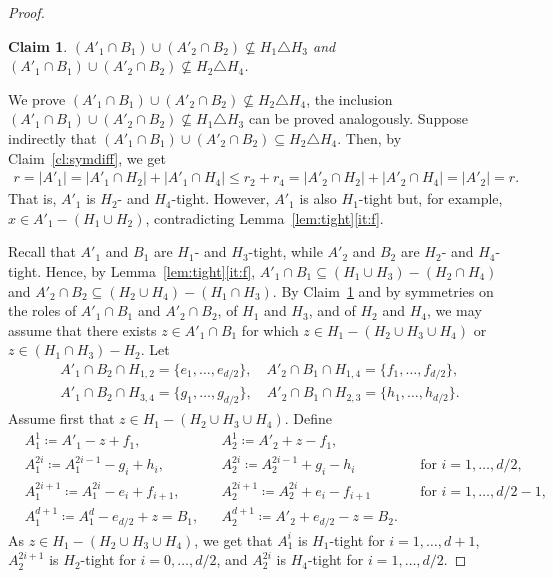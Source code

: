 \documentclass[11pt,a4paper]{article}
\theoremstyle{plain}
\newtheorem{cl}[thm]{Claim}
\theoremstyle{definition}
\newenvironment{claimproof}[1][\proofname]
  {%
    \proof[#1]%
      \renewcommand*\qedsymbol{$\bullet$}%
  }
  {%
    \endproof%
  }
\begin{document}
\begin{proof}
\begin{cl}\label{cl:z}
$(A'_1\cap B_1)\cup(A'_2\cap B_2)\not\subseteq H_1\triangle H_3$ and $(A'_1\cap B_1)\cup(A'_2\cap B_2)\not\subseteq H_2\triangle H_4$.
\end{cl}
\begin{claimproof} 
We prove $(A'_1 \cap B_1) \cup (A'_2 \cap B_2) \not\subseteq H_2 \triangle H_4$, the inclusion $(A'_1 \cap B_1) \cup (A'_2 \cap B_2) \not\subseteq H_1 \triangle H_3$ can be proved analogously. Suppose indirectly that $(A'_1\cap B_1)\cup(A'_2\cap B_2)\subseteq H_2\triangle H_4$. Then, by Claim~\ref{cl:symdiff}, we get
\begin{align*}
r=|A'_1|=|A'_1\cap H_2|+|A'_1\cap H_4|
\leq r_2+r_4=|A'_2\cap H_2|+|A'_2\cap H_4|
= |A'_2|=r.
\end{align*}
That is, $A'_1$ is $H_2$- and $H_4$-tight. However, $A'_1$ is also $H_1$-tight but, for example, $x\in A'_1-(H_1\cup H_2)$, contradicting Lemma~\ref{lem:tight}\ref{it:f}. 
\end{claimproof}

Recall that $A'_1$ and $B_1$ are $H_1$- and $H_3$-tight, while $A'_2$ and $B_2$ are $H_2$- and $H_4$-tight. Hence, by Lemma~\ref{lem:tight}\ref{it:f}, $A'_1\cap B_1\subseteq (H_1\cup H_3)-(H_2\cap H_4)$ and $A'_2\cap B_2\subseteq (H_2\cup H_4)-(H_1\cap H_3)$. By Claim~\ref{cl:z} and by symmetries on the roles of $A'_1\cap B_1$ and $A'_2\cap B_2$, of $H_1$ and $H_3$, and of $H_2$ and $H_4$, we may assume that there exists $z\in A'_1\cap B_1$ for which $z\in H_1-(H_2\cup H_3\cup H_4)$ or $z\in (H_1\cap H_3)-H_2$. Let 
\begin{gather*}
A'_1\cap B_2\cap H_{1,2}=\{e_1,\dots,e_{d/2}\},\quad A'_2\cap B_1\cap H_{1,4}=\{f_1,\dots,f_{d/2}\},\\ 
A'_1\cap B_2\cap H_{3,4}=\{g_1,\dots,g_{d/2}\},\quad A'_2\cap B_1\cap H_{2,3}=\{h_1,\dots,h_{d/2}\}.
\end{gather*}
Assume first that $z\in H_1-(H_2\cup H_3\cup H_4)$. Define 
\begin{align*}
    &A^1_1\coloneqq A'_1-z+f_1, &&A^1_2\coloneqq A'_2+z-f_1, &&\\
    &A^{2i}_1\coloneqq A^{2i-1}_1-g_i+h_i, &&A^{2i}_2\coloneqq A^{2i-1}_2+g_i-h_i && \text{for $i=1,\dots,d/2$,}\\
    &A^{2i+1}_1\coloneqq A^{2i}_1-e_i+f_{i+1}, &&A^{2i+1}_2\coloneqq A^{2i}_2+e_i-f_{i+1} && \text{for $i=1,\dots,d/2-1$,}\\
    &A^{d+1}_1\coloneqq A^{d}_1-e_{d/2}+z=B_1, &&A^{d+1}_2\coloneqq A'_2+e_{d/2}-z=B_2. &&
\end{align*}
As $z\in H_1-(H_2\cup H_3\cup H_4)$, we get that $A^i_1$ is $H_1$-tight for $i=1,\dots,d+1$, $A^{2i+1}_2$ is $H_2$-tight for $i=0,\dots,d/2$, and $A^{2i}_2$ is $H_4$-tight for $i=1,\dots,d/2$. 


\end{proof}
\end{document}
